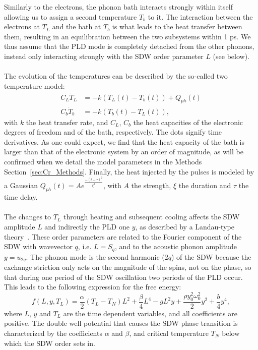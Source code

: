 Similarly to the electrons, the phonon bath interacts strongly within itself allowing us to assign a second temperature $T_b$ to it.
The interaction between the electrons at $T_L$ and the bath at $T_b$ is what leads to the heat transfer between them, resulting in an equilibration between the two subsystems within 1 ps.
We thus assume that the PLD mode is completely detached from the other phonons, instead only interacting strongly with the SDW order parameter $L$ (see below). 
\\\\
The evolution of the temperatures can be described by the so-called two temperature model:
\begin{align}
	\label{eq:Cr_twotemp}
	C_L \dot{T}_L &= -k(T_L(t) - T_b(t)) + Q_{ph}(t) \\
	C_b \dot{T}_b &= -k(T_b(t) - T_L(t)),\nonumber
\end{align}
with $k$ the heat transfer rate, and $C_L$, $C_b$ the heat capacities of the electronic degrees of freedom and of the bath, respectively.
The dots signify time derivatives.
As one could expect, we find that the heat capacity of the bath is larger than that of the electronic system by an order of magnitude, as will be confirmed when we detail the model parameters in the Methods Section~\ref{sec:Cr_Methods}.
Finally, the heat injected by the pulses is modeled by a Gaussian $Q_{ph}(t) = A e^{\frac{-(t - \tau)^2}{\xi^2}}$, with $A$ the strength, $\xi$ the duration and $\tau$ the time delay.
\\\\
The changes to $T_L$ through heating and subsequent cooling affects the SDW amplitude $L$ and indirectly the PLD one $y$, as described by a Landau-type theory~\cite{Khomskii2010}.
These order parameters are related to the Fourier component of the SDW with wavevector $q$, i.e. $L = S_q$, and to the acoustic phonon amplitude $y = u_{2q}$.
The phonon mode is the second harmonic ($2q$) of the SDW because the exchange striction only acts on the magnitude of the spins, not on the phase, so that during one period of the SDW oscillation two periods of the PLD occur.
This leads to the following expression for the free energy:
\begin{equation}
	\label{eq:Cr_landau}
	f(L, y, T_L) = \frac{\alpha}{2}(T_L - T_N) L^2 + \frac{\beta}{4} L^4 - g L^2 y + \frac{\rho y_0^2 \omega_0^2}{2} y^2 + \frac{b}{4} y^4,
\end{equation}
where $L$, $y$ and $T_L$ are the time dependent variables, and all coefficients are positive.
The double well potential that causes the SDW phase transition is characterized by the coefficients $\alpha$ and $\beta$,  and critical temperature $T_N$ below which the SDW order sets in.
